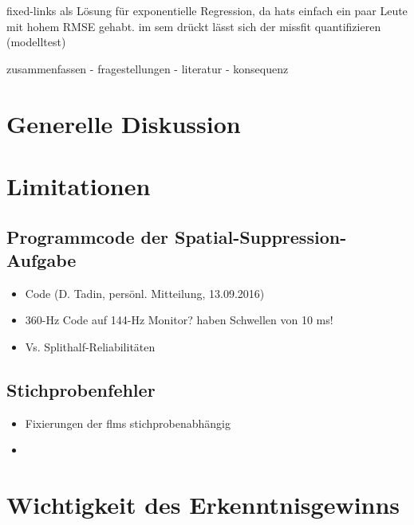 \documentclass[11pt, twoside, a4paper]{book}		%
\begin{document}
fixed-links als Lösung für exponentielle Regression, da hats einfach ein paar Leute mit hohem RMSE gehabt. im sem drückt lässt sich der missfit quantifizieren (modelltest)





zusammenfassen
- fragestellungen
- literatur
- konsequenz

\section{Generelle Diskussion}

\section{Limitationen}

\subsection{Programmcode der Spatial-Suppression-Aufgabe}

\begin{itemize}
	\item Code (D. Tadin, persönl. Mitteilung, 13.09.2016)
	\item 360-Hz Code auf 144-Hz Monitor? \citet{Lappin2009, Tadin2006} haben Schwellen von 10 ms!
	\item Vs. Splithalf-Reliabilitäten
\end{itemize}





\subsection{Stichprobenfehler}

\begin{itemize}
	\item Fixierungen der \glspl{flm} stichprobenabhängig
	\item 
\end{itemize}


\section{Wichtigkeit des Erkenntnisgewinns}



\end{document}
